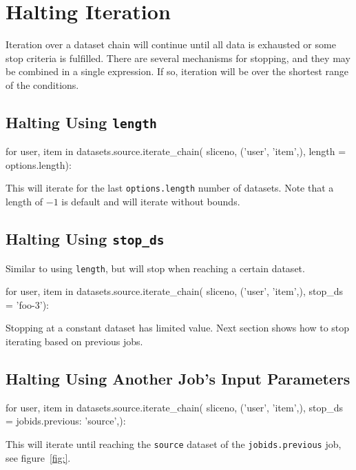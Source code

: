 \section{Halting Iteration}

Iteration over a dataset chain will continue until all data is
exhausted or some stop criteria is fulfilled.  There are several
mechanisms for stopping, and they may be combined in a single
expression.  If so, iteration will be over the shortest range of the
conditions.

\subsection*{Halting Using \texttt{length}}
\begin{python}
for user, item in datasets.source.iterate_chain(
    sliceno, ('user', 'item',),
    length = options.length):
\end{python}
This will iterate for the last \texttt{options.length} number of
datasets.  Note that a length of $-1$ is default and will iterate
without bounds.


\subsection*{Halting Using \texttt{stop\_ds}}
Similar to using \texttt{length}, but will stop when reaching a
certain dataset.
\begin{python}
for user, item in datasets.source.iterate_chain(
    sliceno, ('user', 'item',),
    stop_ds = 'foo-3'):
\end{python}
Stopping at a constant dataset has limited value.  Next section shows
how to stop iterating based on previous jobs.



\subsection*{Halting Using Another Job's Input Parameters}
\begin{python}
for user, item in datasets.source.iterate_chain(
    sliceno, ('user', 'item',),
    stop_ds = {jobids.previous: 'source',}):
\end{python}
This will iterate until reaching the \texttt{source} dataset of
the \texttt{jobids.previous} job, see figure~\ref{fig:}.




